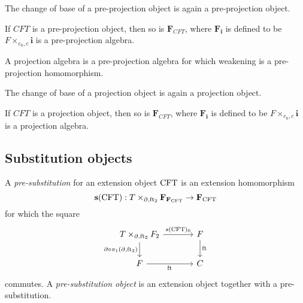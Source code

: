 \begin{lem}
The change of base of a pre-projection object is again a pre-projection object.
\end{lem}

\begin{lem}
If $CFT$ is a pre-projection object, then so is $\mathbf{F}_{CFT}$, where
$\mathbf{F}_{\mathbf{i}}$ is defined to be $F\times_{e_0,c}\mathbf{i}$ is
a pre-projection algebra.
\end{lem}

\begin{defn}
A projection algebra is a pre-projection algebra for which weakening is a
pre-projection homomorphism.
\end{defn}

\begin{cor}
The change of base of a projection object is again a projection object.
\end{cor}

\begin{cor}
If $CFT$ is a projection object, then so is $\mathbf{F}_{CFT}$, where
$\mathbf{F}_{\mathbf{i}}$ is defined to be $F\times_{e_0,c}\mathbf{i}$ is
a projection algebra.
\end{cor}

\subsection{Substitution objects}

\begin{defn}
A \emph{pre-substitution} for an extension object $\mathrm{CFT}$ is an
extension homomorphism
\begin{equation*}
\mathbf{s}(\stesys):\cobesys{\stesyst}{\famesys{\famesys{\stesys}}}{\ebd}{\eft[2]}\to \famesys{\stesys}
\end{equation*}
for which the square
\begin{equation*}
\begin{tikzcd}[column sep=large]
\pullback{\stesyst}{\stesysf_2}{\ebd}{\eft[2]}
  \ar{r}{s(\stesys)_0}
  \ar{d}[swap]{\ebd\circ\pullbackpr{1}{\ebd}{\eft[2]}}
  &
\stesysf 
  \ar{d}{\eft}
  \\
\stesysf 
  \ar{r}[swap]{\eft}
  &
\stesysc
\end{tikzcd}
\end{equation*}
commutes. A \emph{pre-substitution object} is an extension object
together with a pre-substitution.
\end{defn}

